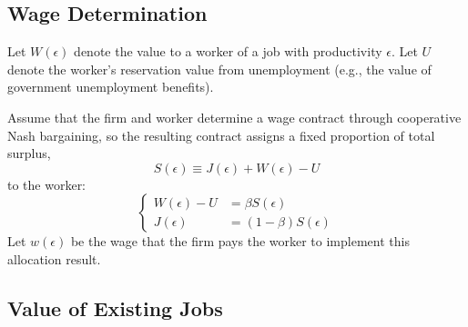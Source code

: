 \documentclass[12pt]{article}
\begin{document}
\subsection{Wage Determination}
Let $W(\epsilon)$ denote the value to a worker of a job with productivity $\epsilon$. Let $U$ denote the worker's reservation value from unemployment (e.g., the value of government unemployment benefits). 

Assume that the firm and worker determine a wage contract through cooperative Nash bargaining, so the resulting contract assigns a fixed proportion of total surplus,
\[S(\epsilon) \equiv J(\epsilon) + W(\epsilon) - U\]
to the worker:
\begin{equation}
	\begin{cases}
		W(\epsilon) - U & = \beta S(\epsilon) \\
		J(\epsilon) & = (1-\beta) S(\epsilon)
	\end{cases}
\end{equation} 
Let $w(\epsilon)$ be the wage that the firm pays the worker to implement this allocation result.


\subsection{Value of Existing Jobs}
\end{document}
